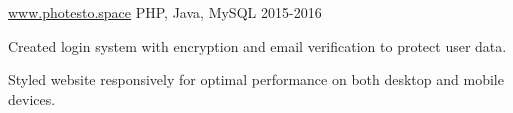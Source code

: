 \begin{cventries}
   {\href{www.photesto.space}{www.photesto.space}} {PHP,
    Java, MySQL} {2015-2016} {
    \begin{cvitems}
    \item Created login system with encryption and email verification to protect
      user data.
    \item Styled website responsively for optimal performance on both desktop
      and mobile devices.
    \end{cvitems}
  }
  
\end{cventries}
